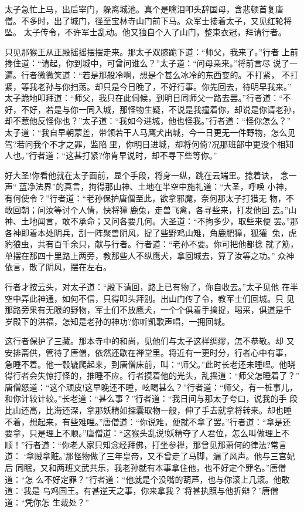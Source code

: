 太子急忙上马，出后宰门，躲离城池。真个是噙泪叩头辞国母，含悲顿首复唐
僧。不多时，出了城门，径至宝林寺山门前下马。众军士接着太子，又见红轮将坠。
太子传令，不许军士乱动。他又独自个入了山门，整束衣冠，拜请行者。

只见那猴王从正殿摇摇摆摆走来。那太子双膝跪下道：“师父，我来了。”行者
上前搀住道：“请起，你到城中，可曾问谁么？”太子道：“问母亲来。”将前言尽
说了一遍。行者微微笑道：“若是那般冷啊，想是个甚么冰冷的东西变的。不打紧，
不打紧，等我老孙与你扫荡。却只是今日晚了，不好行事。你先回去，待明早我来。”
太子跪地叩拜道：“师父，我只在此伺候，到明日同师父一路去罢。”行者道：“不
好，不好，若是与你一同入城，那怪物生疑，不说是我撞着你，却说是你请老孙，
却不惹他反怪你也？”太子道：“我如今进城，他也怪我。”行者道：“怪你怎么？”
太子道：“我自早朝蒙差，带领若干人马鹰犬出城，今一日更无一件野物，怎么见
驾?若问我个不才之罪，监陷里，你明日进城，却将何倚?况那班部中更没个相知
人也。”行者道：“这甚打紧?你肯早说时，却不寻下些等你。”

好大圣!你看他就在太子面前，显个手段，将身一纵，跳在云端里。捻着诀，
念一声“蓝净法界”的真言，拘得那山神、土地在半空中施礼道：“大圣，呼唤
小神，有何使令？”行者道：“老孙保护唐僧至此，欲拿邪魔，奈何那太子打猎无
物，不敢回朝；问汝等讨个人情，快将獐鹿兔，走兽飞禽，各寻些来，打发他回
去。”山神、土地闻言，敢不承命；又问各要几何。大圣道：“不拘多少，取些来便
罢。”那各神即着本处阴兵，刮一阵聚兽阴风，捉了些野鸡山雉，角鹿肥獐，狐獾
兔，虎豹狼虫，共有百千余只，献与行者。行者道：“老孙不要。你可把他都捻
就了筋，单摆在那四十里路上两旁，教那些人不纵鹰犬，拿回城去，算了汝等之功。”
众神依言，散了阴风，摆在左右。

行者才按云头，对太子道：“殿下请回，路上已有物了，你自收去。”太子见他
在半空中弄此神通，如何不信，只得叩头拜别。出山门传了令，教军士们回城。只
见那路旁果有无限的野物，军士们不放鹰犬，一个个俱着手擒捉，喝采，俱道是千
岁殿下的洪福，怎知是老孙的神功?你听凯歌声唱，一拥回城。

这行者保护了三藏。那本寺中的和尚，见他们与太子这样绸缪，怎不恭敬。却
又安排斋供，管待了唐僧，依然还歇在禅堂里。将近有一更时分，行者心中有事，
急睡不着。他一毂辘爬起来，到唐僧床前，叫：“师父。”此时长老还未睡哩。他晓
得行者会失惊打怪的，推睡不应。行者摸着他的光头，乱摇道：“师父怎睡着了？”
唐僧怒道：“这个顽皮!这早晚还不睡，吆喝甚么？”行者道：“师父，有一桩事儿，
和你计较计较。”长老道：“甚么事？”行者道：“我日间与那太子夸口，说我的手
段比山还高，比海还深，拿那妖精如探囊取物一般，伸了手去就拿将转来。却也睡
不着，想起来，有些难哩。”唐僧道：“你说难，便就不拿了罢。”行者道：“拿是还
要拿，只是理上不顺。”唐僧道：“这猴头乱说!妖精夺了人君位，怎么叫做理上不
顺！”行者道：“你老人家只知念经拜佛，打坐参禅，那曾见那萧何的律法?常言道：
‘拿贼拿赃。’那怪物做了三年皇帝，又不曾走了马脚，漏了风声。他与三宫妃后
同眠，又和两班文武共乐，我老孙就有本事拿住他，也不好定个罪名。”唐僧道：“怎
么不好定罪？”行者道：“他就是个没嘴的葫芦，也与你滚上几滚。他敢道：‘我是
乌鸡国王。有甚逆天之事，你来拿我？’将甚执照与他折辩？”唐僧道：“凭你怎
生裁处？”

